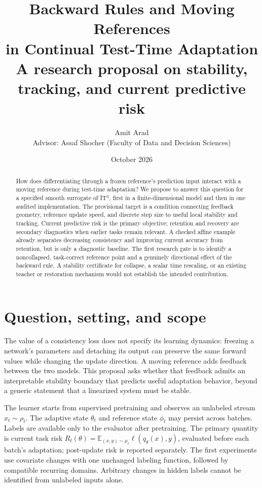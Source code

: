 \documentclass[11pt,a4paper]{article}
\title{Backward Rules and Moving References\\in Continual Test-Time Adaptation\\[0.4em]
\large A research proposal on stability, tracking, and current predictive risk}
\author{Amit Arad\\[0.3em]
\small Advisor: Assaf Shocher (Faculty of Data and Decision Sciences)}
\date{October 2026}
\newcommand{\E}{\mathbb{E}}
\begin{document}
\maketitle
\begin{abstract}
How does differentiating through a frozen reference's prediction input
interact with a moving reference during test-time adaptation? We propose
to answer this question for a specified smooth surrogate of IT$^3$, first
in a finite-dimensional model and then in one audited implementation.
The provisional target is a condition connecting feedback geometry,
reference update speed, and discrete step size to useful local stability
and tracking. Current predictive risk is the primary objective; retention
and recovery are secondary diagnostics when earlier tasks remain relevant.
A checked affine example already separates decreasing consistency and
improving current accuracy from retention, but is only a diagnostic baseline.
The first research gate is to identify a noncollapsed, task-correct reference
point and a genuinely directional effect of the backward rule. A stability
certificate for collapse, a scalar time rescaling, or an existing teacher
or restoration mechanism would not establish the intended contribution.
\end{abstract}

\section{Question, setting, and scope}
The value of a consistency loss does not specify its learning dynamics:
freezing a network's parameters and detaching its output can preserve the
same forward values while changing the update direction. A moving reference
adds feedback between the two models. This proposal asks whether that
feedback admits an interpretable stability boundary that predicts useful
adaptation behavior, beyond a generic statement that a linearized system
must be stable.

The learner starts from supervised pretraining and observes an unlabeled
stream $x_t\sim\rho_t$. The adaptive state $\theta_t$ and reference state
$\phi_t$ may persist across batches. Labels are available only to the
evaluator after pretraining. The primary quantity is current task risk
$R_t(\theta)=\E_{(x,y)\sim\mu_t}\ell(q_\theta(x),y)$, evaluated before each
batch's adaptation; post-update risk is reported separately. The first
experiments use covariate changes with one unchanged labeling function,
followed by compatible recurring domains. Arbitrary changes in hidden
labels cannot be identified from unlabeled inputs alone.
\end{document}
